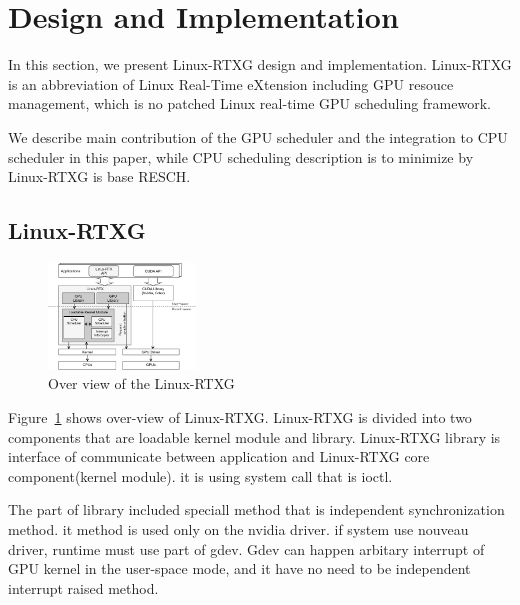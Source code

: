 \section{Design and Implementation}\label{sec:design_imple}
In this section, we present Linux-RTXG design and implementation.
Linux-RTXG is an abbreviation of Linux Real-Time eXtension including GPU resouce management,
which is no patched Linux real-time GPU scheduling framework.

We describe main contribution of the GPU scheduler and the integration to CPU scheduler in this paper,
while CPU scheduling description is to minimize by Linux-RTXG is base RESCH.


\subsection{Linux-RTXG}
\begin{figure}[t]
\begin{center}
\includegraphics[width=0.35\textwidth]{img/overview.pdf}
\caption{Over view of the Linux-RTXG}
\end{center}
\label{fig:overview}
\end{figure}

Figure~\ref{fig:overview} shows over-view of Linux-RTXG.
Linux-RTXG is divided into two components that are loadable kernel module and library.
Linux-RTXG library is interface of communicate between application and Linux-RTXG core component(kernel module).
it is using system call that is ioctl.

The part of library included speciall method that is independent synchronization method.
it method is used only on the nvidia driver.
if system use nouveau driver, runtime must use part of gdev.
Gdev can happen arbitary interrupt of GPU kernel in the user-space mode, and it have no need to be independent interrupt raised method.

